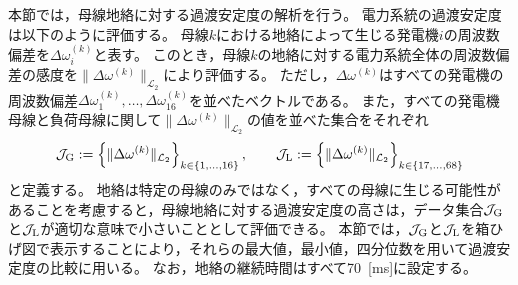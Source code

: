 \documentclass[tombow,dvipdfmx]{corona-a5-1.1}
\begin{document}
本節では，母線地絡に対する過渡安定度の解析を行う。
電力系統の過渡安定度は以下のように評価する。
母線$k$における地絡によって生じる発電機$i$の周波数偏差を$\Delta \omega_i^{(k)}$と表す。
このとき，母線$k$の地絡に対する電力系統全体の周波数偏差の感度を$\|\Delta \omega^{(k)}\|_{\mathcal{L}_2}$により評価する。
ただし，$\Delta \omega^{(k)}$はすべての発電機の周波数偏差$\Delta \omega_1^{(k)},\ldots,\Delta \omega_{16}^{(k)}$を並べたベクトルである。
また，すべての発電機母線と負荷母線に関して$\|\Delta \omega^{(k)}\|_{\mathcal{L}_2}$の値を並べた集合をそれぞれ
\begin{align*}%
\mathcal{J}_{\rm G}:=
\left\{
\| \Delta \omega^{(k)} \|_{\mathcal{L}_2}
\right\}_{k\in \{1,\ldots,16\} }
,\qquad
\mathcal{J}_{\rm L}
:=
\left\{
\| \Delta \omega^{(k)} \|_{\mathcal{L}_2}
\right\}_{k\in \{17,\ldots,68\} }
\end{align*}
と定義する。
地絡は特定の母線のみではなく，すべての母線に生じる可能性があることを考慮すると，母線地絡に対する過渡安定度の高さは，データ集合$\mathcal{J}_{\rm G}$と$\mathcal{J}_{\rm L}$が適切な意味で小さいこととして評価できる。
本節では，$\mathcal{J}_{\rm G}$と$\mathcal{J}_{\rm L}$を箱ひげ図で表示することにより，それらの最大値，最小値，四分位数を用いて過渡安定度の比較に用いる。
なお，地絡の継続時間はすべて70~[ms]に設定する。
\end{document}
